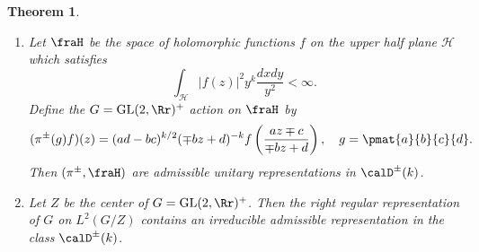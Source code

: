 \documentclass{article}
\newtheorem{theorem}{Theorem}[section]
\newcommand{\GL}{\mathrm{GL}}
\begin{document}
\begin{theorem}
\begin{enumerate}
\item Let $\fraH$ be the space of holomorphic functions $f$ on the upper half plane $\mathcal{H}$ which satisfies
$$
\int_{\mathcal{H}} |f(z)|^{2} y^{k} \frac{dxdy}{y^{2}}<\infty.
$$
Define the $G = \GL(2, \Rr)^{+}$ action on $\fraH$ by 
$$
(\pi^{\pm}(g)f)(z)= (ad-bc)^{k/2} (\mp bz+d)^{-k} f\left( \frac{az\mp c}{\mp bz + d}\right), \quad g = \pmat{a}{b}{c}{d}.
$$
Then $(\pi^{\pm}, \fraH)$ are admissible unitary representations in $\calD^{\pm}(k)$. 
\item Let $Z$ be the center of $G = \GL(2, \Rr)^{+}$. Then the right regular representation of $G$ on $L^{2}(G/Z)$ contains an irreducible admissible representation in the class $\calD^{\pm}(k)$. 
\end{enumerate}
\end{theorem}
\end{document}
